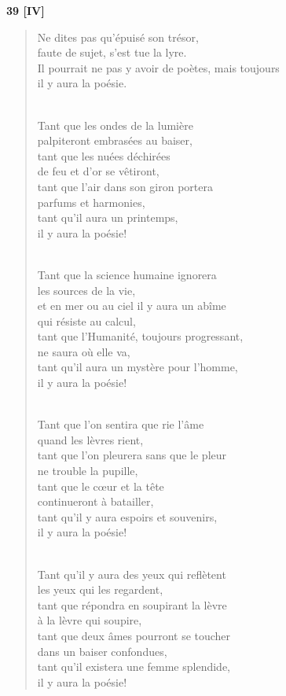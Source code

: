 \documentclass[a4paper,11pt]{book}
\begin{document}
\bigskip

\begin{center} {\bf 39 [IV]} \end{center}

\begin{verse}
Ne dites pas qu'épuisé son trésor, \\
faute de sujet, s'est tue la lyre. \\
Il pourrait ne pas y avoir de poètes, mais toujours \\
il y aura la poésie. \\ \

Tant que les ondes de la lumière \\
palpiteront embrasées au baiser, \\
tant que les nuées déchirées \\
de feu et d'or se vêtiront, \\
tant que l'air dans son giron portera \\
parfums et harmonies, \\
tant qu'il aura un printemps, \\
il y aura la poésie! \\ \

Tant que la science humaine ignorera \\
les sources de la vie, \\
et en mer ou au ciel il y aura un abîme \\
qui résiste au calcul, \\
tant que l'Humanité, toujours progressant, \\
ne saura où elle va, \\
tant qu'il aura un mystère pour l'homme, \\
il y aura la poésie! \\ \

Tant que l'on sentira que rie l'âme \\
quand les lèvres rient, \\
tant que l'on pleurera sans que le pleur \\
ne trouble la pupille, \\
tant que le c{\oe}ur et la tête \\
continueront à batailler, \\
tant qu'il y aura espoirs et souvenirs, \\
il y aura la poésie! \\ \

Tant qu'il y aura des yeux qui reflètent \\
les yeux qui les regardent, \\
tant que répondra en soupirant la lèvre \\
à la lèvre qui soupire, \\
tant que deux âmes pourront se toucher \\
dans un baiser confondues, \\
tant qu'il existera une femme splendide, \\
il y aura la poésie! \\
\end{verse}
\end{document}
